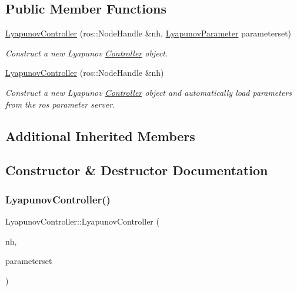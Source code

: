 \subsection*{Public Member Functions}
\begin{DoxyCompactItemize}
\item 
\hyperlink{classLyapunovController_a3b17565509b8e085861a85146738766f}{Lyapunov\+Controller} (ros\+::\+Node\+Handle \&nh, \hyperlink{structLyapunovController_1_1LyapunovParameter}{Lyapunov\+Parameter} parameterset)
\begin{DoxyCompactList}\small\item\em Construct a new Lyapunov \hyperlink{classController}{Controller} object. \end{DoxyCompactList}\item 
\hyperlink{classLyapunovController_a2812acc6b131e59ac0fc9b0633038999}{Lyapunov\+Controller} (ros\+::\+Node\+Handle \&nh)
\begin{DoxyCompactList}\small\item\em Construct a new Lyapunov \hyperlink{classController}{Controller} object and automatically load parameters from the ros parameter server. \end{DoxyCompactList}\end{DoxyCompactItemize}
\subsection*{Additional Inherited Members}


\subsection{Constructor \& Destructor Documentation}
\mbox{\label{classLyapunovController_a3b17565509b8e085861a85146738766f}} 
\subsubsection{\texorpdfstring{Lyapunov\+Controller()}{LyapunovController()}\hspace{0.1cm}{\footnotesize\ttfamily [1/2]}}
{\footnotesize\ttfamily Lyapunov\+Controller\+::\+Lyapunov\+Controller (\begin{DoxyParamCaption}\item[{ros\+::\+Node\+Handle \&}]{nh,  }\item[{\hyperlink{structLyapunovController_1_1LyapunovParameter}{Lyapunov\+Parameter}}]{parameterset }\end{DoxyParamCaption})}



